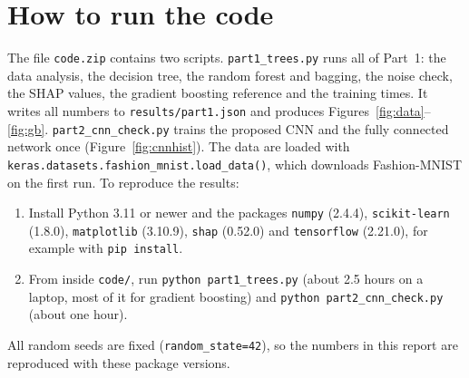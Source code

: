 \documentclass[11pt,a4paper]{article}
\newcommand{\pkg}[1]{\texttt{#1}}
\begin{document}
\section{How to run the code}
\label{app:code}
\raggedright
The file \pkg{code.zip} contains two scripts. \pkg{part1\_trees.py} runs all of Part~1: the data analysis, the decision tree, the random forest and bagging, the noise check, the SHAP values, the gradient boosting reference and the training times. It writes all numbers to \pkg{results/part1.json} and produces Figures~\ref{fig:data}--\ref{fig:gb}. \pkg{part2\_cnn\_check.py} trains the proposed CNN and the fully connected network once (Figure~\ref{fig:cnnhist}). The data are loaded with \pkg{keras.datasets.fashion\_mnist.load\_data()}, which downloads Fashion-MNIST on the first run. To reproduce the results:
\begin{enumerate}[leftmargin=*,itemsep=1pt,topsep=2pt]
\item Install Python 3.11 or newer and the packages \pkg{numpy} (2.4.4), \pkg{scikit-learn} (1.8.0), \pkg{matplotlib} (3.10.9), \pkg{shap} (0.52.0) and \pkg{tensorflow} (2.21.0), for example with \pkg{pip install}.
\item From inside \pkg{code/}, run \pkg{python part1\_trees.py} (about 2.5 hours on a laptop, most of it for gradient boosting) and \pkg{python part2\_cnn\_check.py} (about one hour).
\end{enumerate}
All random seeds are fixed (\pkg{random\_state=42}), so the numbers in this report are reproduced with these package versions.
\end{document}
